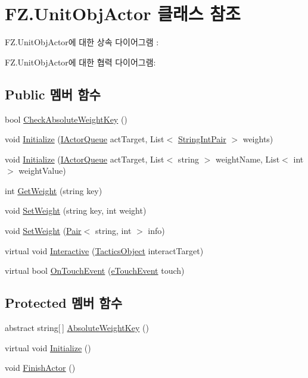 \hypertarget{class_f_z_1_1_unit_obj_actor}{}\section{F\+Z.\+Unit\+Obj\+Actor 클래스 참조}
\label{class_f_z_1_1_unit_obj_actor}


F\+Z.\+Unit\+Obj\+Actor에 대한 상속 다이어그램 \+: 


F\+Z.\+Unit\+Obj\+Actor에 대한 협력 다이어그램\+:
\subsection*{Public 멤버 함수}
\begin{DoxyCompactItemize}
\item 
bool \hyperlink{class_f_z_1_1_actor_aa78fa8d765cfc56474c3714d38bcc13b}{Check\+Absolute\+Weight\+Key} ()
\item 
void \hyperlink{class_f_z_1_1_actor_ac29de02b4c3cc1012143f6531f5809ed}{Initialize} (\hyperlink{interface_f_z_1_1_i_actor_queue}{I\+Actor\+Queue} act\+Target, List$<$ \hyperlink{class_f_z_1_1_string_int_pair}{String\+Int\+Pair} $>$ weights)
\item 
void \hyperlink{class_f_z_1_1_actor_a968a8b42fa52f121bdcc9c8ea8136eb9}{Initialize} (\hyperlink{interface_f_z_1_1_i_actor_queue}{I\+Actor\+Queue} act\+Target, List$<$ string $>$ weight\+Name, List$<$ int $>$ weight\+Value)
\item 
int \hyperlink{class_f_z_1_1_actor_ab6dee08c1296f3c020694fd9408b7c33}{Get\+Weight} (string key)
\item 
void \hyperlink{class_f_z_1_1_actor_a0f36cb598cc81fc94bf5de590382004e}{Set\+Weight} (string key, int weight)
\item 
void \hyperlink{class_f_z_1_1_actor_a6c257b538187513e247b92905da53954}{Set\+Weight} (\hyperlink{class_f_z_1_1_pair}{Pair}$<$ string, int $>$ info)
\item 
virtual void \hyperlink{class_f_z_1_1_actor_a1d5780d31a35893d38598d78c8f0c74a}{Interactive} (\hyperlink{class_tactics_object}{Tactics\+Object} interact\+Target)
\item 
virtual bool \hyperlink{class_f_z_1_1_actor_a9f30b12f3615a447df054d48ef4e22c7}{On\+Touch\+Event} (\hyperlink{_touch_manager_8cs_ae33e321a424fe84ba8b2fdb81ad40a68}{e\+Touch\+Event} touch)
\end{DoxyCompactItemize}
\subsection*{Protected 멤버 함수}
\begin{DoxyCompactItemize}
\item 
abstract string\mbox{[}$\,$\mbox{]} \hyperlink{class_f_z_1_1_actor_aade2d1f3a48ea90fe361a2e0e3ff9985}{Absolute\+Weight\+Key} ()
\item 
virtual void \hyperlink{class_f_z_1_1_actor_a57abd0487ac5f6b273d1a9e06b3087ef}{Initialize} ()
\item 
void \hyperlink{class_f_z_1_1_actor_a26e516ab18ada56bb6a9e26c8fd6b709}{Finish\+Actor} ()
\end{DoxyCompactItemize}
